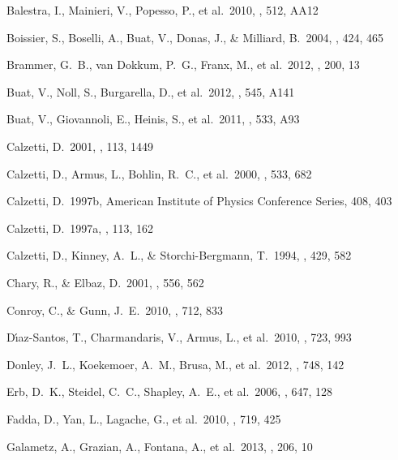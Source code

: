 \documentclass[preprint]{aastex}
\begin{document}
\begin{thebibliography}

 Balestra, I., Mainieri, V., Popesso,
P., et al.\ 2010, \aap, 512, AA12

 Boissier, S., Boselli, A.,
Buat, V., Donas, J., \& Milliard, B.\ 2004, \aap, 424, 465

 Brammer, G.~B., van 
Dokkum, P.~G., Franx, M., et al.\ 2012, \apjs, 200, 13

 Buat, V., Noll, S., Burgarella, D.,
et al.\ 2012, \aap, 545, A141 

 Buat, V., Giovannoli, E., Heinis, S.,
et al.\ 2011, \aap, 533, A93 

 Calzetti, D.\ 2001, \pasp, 113, 1449

 Calzetti, D., Armus, L., Bohlin,
R.~C., et al.\ 2000, \apj, 533, 682

 Calzetti, D.\ 1997b, American 
Institute of Physics Conference Series, 408, 403

 Calzetti, D.\ 1997a, \aj, 113, 162

 Calzetti, D., Kinney, A.~L., \&
Storchi-Bergmann, T.\ 1994, \apj, 429, 582

 Chary, R., \& Elbaz, D.\ 2001, \apj,
556, 562

 Conroy, C., \& Gunn, J.~E.\ 2010, \apj,
712, 833

 D{\'{\i}}az-Santos, T.,
Charmandaris, V., Armus, L., et al.\ 2010, \apj, 723, 993

 Donley, J.~L., Koekemoer, A.~M.,
Brusa, M., et al.\ 2012, \apj, 748, 142

 Erb, D.~K., Steidel, C.~C., 
Shapley, A.~E., et al.\ 2006, \apj, 647, 128

 Fadda, D., Yan, L., 
Lagache, G., et al.\ 2010, \apj, 719, 425

 Galametz, A., Grazian, A.,
Fontana, A., et al.\ 2013, \apjs, 206, 10


\end{thebibliography}
\end{document}
